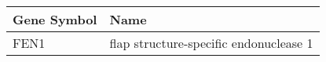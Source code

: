 \begin{tabular}{ll}
\toprule
Gene Symbol &                                   Name \\
\midrule
       FEN1 & flap structure-specific endonuclease 1 \\
\bottomrule
\end{tabular}

